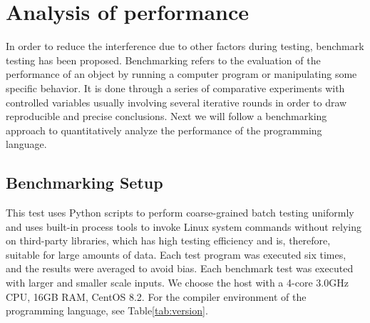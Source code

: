\section{Analysis of performance}

In order to reduce the interference due to other factors
during testing, benchmark testing has been proposed.
Benchmarking refers to the evaluation of
the performance of an object by running a computer program or
manipulating some specific behavior\cite{fleming1986not}.
It is done through a series of comparative experiments with
controlled variables usually involving several iterative rounds
in order to draw reproducible and precise conclusions.
Next we will follow a benchmarking approach to quantitatively
analyze the performance of the programming language.

\subsection{Benchmarking Setup}


This test uses Python scripts to perform coarse-grained
batch testing uniformly and uses built-in process tools
to invoke Linux system commands without relying on
third-party libraries, which has high testing efficiency
and is, therefore, suitable for large amounts of data.
Each test program was executed six times, and the results
were averaged to avoid bias.
Each benchmark test was
executed with larger and smaller scale inputs.
We choose the host with a 4-core 3.0GHz CPU, 16GB RAM, CentOS 8.2.
For the compiler environment of the programming
language, see Table\ref{tab:version}.

